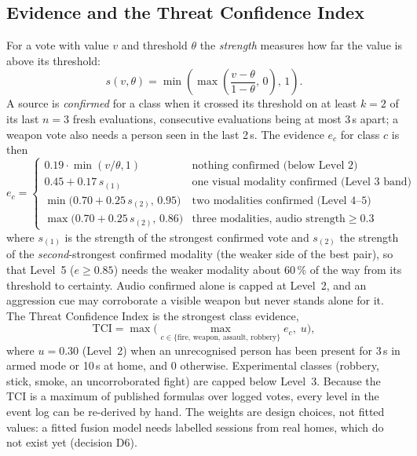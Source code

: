 \subsection{Evidence and the Threat Confidence Index}
\label{sec:tci}
For a vote with value $v$ and threshold $\theta$ the \emph{strength} measures how far the value is above its threshold:
\begin{equation}
s(v,\theta)=\min\!\left(\max\!\left(\frac{v-\theta}{1-\theta},\,0\right),\,1\right).
\label{eq:strength}
\end{equation}
A source is \emph{confirmed} for a class when it crossed its threshold on at least $k=2$ of its last $n=3$ fresh evaluations, consecutive evaluations being at most 3\,s apart; a weapon vote also needs a person seen in the last 2\,s. The evidence $e_c$ for class $c$ is then
\begin{equation}
e_c=\begin{cases}
0.19\cdot\min(v/\theta,1) & \text{nothing confirmed (below Level 2)}\\[2pt]
0.45+0.17\,s_{(1)} & \text{one visual modality confirmed (Level 3 band)}\\[2pt]
\min\big(0.70+0.25\,s_{(2)},\,0.95\big) & \text{two modalities confirmed (Level 4--5)}\\[2pt]
\max\big(0.70+0.25\,s_{(2)},\,0.86\big) & \text{three modalities, audio strength} \geq 0.3
\end{cases}
\label{eq:evidence}
\end{equation}
where $s_{(1)}$ is the strength of the strongest confirmed vote and $s_{(2)}$ the strength of the \emph{second}-strongest confirmed modality (the weaker side of the best pair), so that Level~5 ($e\geq 0.85$) needs the weaker modality about 60\,\% of the way from its threshold to certainty. Audio confirmed alone is capped at Level~2, and an aggression cue may corroborate a visible weapon but never stands alone for it. The Threat Confidence Index is the strongest class evidence,
\begin{equation}
\mathrm{TCI}=\max\Big(\max_{c\in\{\text{fire, weapon, assault, robbery}\}} e_c,\; u\Big),
\label{eq:tci}
\end{equation}
where $u=0.30$ (Level~2) when an unrecognised person has been present for 3\,s in armed mode or 10\,s at home, and 0 otherwise. Experimental classes (robbery, stick, smoke, an uncorroborated fight) are capped below Level~3. Because the TCI is a maximum of published formulas over logged votes, every level in the event log can be re-derived by hand. The weights are design choices, not fitted values: a fitted fusion model needs labelled sessions from real homes, which do not exist yet (decision D6).


